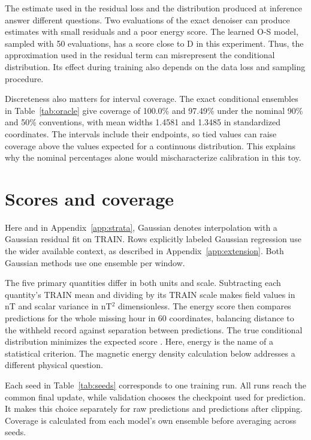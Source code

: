 \documentclass{article}
\begin{document}
The estimate used in the residual loss and the distribution produced at inference answer different questions. Two evaluations of the exact denoiser can produce estimates with small residuals and a poor energy score. The learned O-S model, sampled with 50 evaluations, has a score close to D in this experiment. Thus, the approximation used in the residual term can misrepresent the conditional distribution. Its effect during training also depends on the data loss and sampling procedure.

Discreteness also matters for interval coverage. The exact conditional ensembles in Table~\ref{tab:oracle} give coverage of 100.0\% and 97.49\% under the nominal 90\% and 50\% conventions, with mean widths 1.4581 and 1.3485 in standardized coordinates. The intervals include their endpoints, so tied values can raise coverage above the values expected for a continuous distribution. This explains why the nominal percentages alone would mischaracterize calibration in this toy.

\section{Scores and coverage}
\label{app:details}

Here and in Appendix~\ref{app:strata}, Gaussian denotes interpolation with a Gaussian residual fit on TRAIN. Rows explicitly labeled Gaussian regression use the wider available context, as described in Appendix~\ref{app:extension}. Both Gaussian methods use one ensemble per window.

The five primary quantities differ in both units and scale. Subtracting each quantity's TRAIN mean and dividing by its TRAIN scale makes field values in nT and scalar variance in nT$^2$ dimensionless. The energy score then compares predictions for the whole missing hour in 60 coordinates, balancing distance to the withheld record against separation between predictions. The true conditional distribution minimizes the expected score \citep{gneiting2007strictly}. Here, energy is the name of a statistical criterion. The magnetic energy density calculation below addresses a different physical question.

Each seed in Table~\ref{tab:seeds} corresponds to one training run. All runs reach the common final update, while validation chooses the checkpoint used for prediction. It makes this choice separately for raw predictions and predictions after clipping. Coverage is calculated from each model's own ensemble before averaging across seeds.
\end{document}
